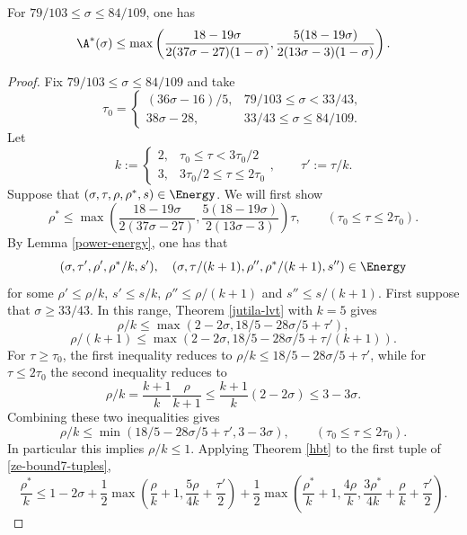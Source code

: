 \begin{theorem}\label{imp-energy-bound7}
For $79/103 \le \sigma \le 84/109$, one has
\[
\A^*(\sigma) \le \max\left(\frac{18 - 19\sigma}{2(37\sigma - 27)(1 - \sigma)}, \frac{5(18 - 19\sigma)}{2(13\sigma - 3)(1 - \sigma)}\right).
\]
\end{theorem}
\derived
{}

\begin{proof}
Fix $79/103 \le \sigma \le 84/109$ and take
\[
\tau_0 = \begin{cases}
(36\sigma - 16)/5,& 79/103 \le \sigma < 33/43,\\
38\sigma - 28,& 33/43 \le \sigma \le 84/109.
\end{cases}
\]
Let
\[
k := \begin{cases}
2,& \tau_0 \le \tau < 3\tau_0/2\\
3,& 3\tau_0/2 \le \tau \le 2\tau_0
\end{cases},\qquad \tau' := \tau/k.
\]
Suppose that $(\sigma, \tau, \rho, \rho^*, s) \in \Energy$. We will first show
\begin{equation}\label{ze-bound7-rhostar-bound}
\rho^* \le \max\left(\frac{18 - 19\sigma}{2(37\sigma - 27)}, \frac{5(18 - 19\sigma)}{2(13\sigma - 3)}\right)\tau,\qquad (\tau_0 \le \tau \le 2\tau_0).
\end{equation}
By Lemma \ref{power-energy}, one has that
\begin{equation}\label{ze-bound7-tuples}
(\sigma, \tau', \rho', \rho^*/k, s'),\quad (\sigma, \tau/(k + 1), \rho'', \rho^*/(k + 1), s'') \in \Energy
\end{equation}
for some $\rho' \le \rho/k$, $s' \le s/k$, $\rho'' \le \rho/(k + 1)$ and $s'' \le s/(k + 1)$.
First suppose that $\sigma \ge 33/43$. In this range, Theorem \ref{jutila-lvt} with $k = 5$ gives
\[
\rho/k \le \max(2 - 2\sigma, 18/5 - 28\sigma/5 + \tau'),
\]
\[
\rho/(k + 1) \le \max(2 - 2\sigma, 18/5 - 28\sigma/5 + \tau/(k + 1)).
\]
For $\tau \ge \tau_0$, the first inequality reduces to $\rho/k \le 18/5 - 28\sigma/5 + \tau'$, while for $\tau \le 2\tau_0$ the second inequality reduces to
\[
\rho/k = \frac{k + 1}{k}\frac{\rho}{k + 1} \le \frac{k + 1}{k}(2 - 2\sigma) \le 3 - 3\sigma.
\]
Combining these two inequalities gives
\[
\rho/k \le \min\left(18/5 - 28\sigma/5 + \tau', 3 - 3\sigma\right),\qquad (\tau_0 \le \tau \le 2\tau_0).
\]
In particular this implies $\rho/k \le 1$. Applying Theorem \ref{hbt} to the first tuple of \eqref{ze-bound7-tuples},
\[
\frac{\rho^*}{k} \le 1-2\sigma + \frac{1}{2}\max(\frac{\rho}{k}+1, \frac{5\rho}{4k} + \frac{\tau'}{2}) + \frac{1}{2}\max(\frac{\rho^*}{k}+1, \frac{4\rho}{k}, \frac{3\rho^*}{4k} +\frac{\rho}{k}+\frac{\tau'}{2}).
\]
\end{proof}
